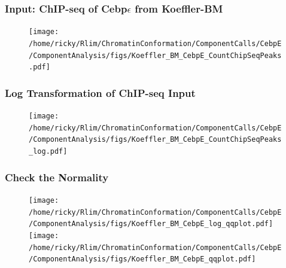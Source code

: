 \documentclass[notes]{beamer}
\begin{document}
\begin{frame}
    \frametitle{Input: ChIP-seq of Cebp$\epsilon$ from Koeffler-BM}
    \begin{figure}
        \texttt{[image: /home/ricky/Rlim/ChromatinConformation/ComponentCalls/CebpE/ComponentAnalysis/figs/Koeffler\_BM\_CebpE\_CountChipSeqPeaks.pdf]}
    \end{figure}
\end{frame}

\begin{frame}                                                                                                                        
    \frametitle{Log Transformation of ChIP-seq Input}
    \begin{figure}
        \texttt{[image: /home/ricky/Rlim/ChromatinConformation/ComponentCalls/CebpE/ComponentAnalysis/figs/Koeffler\_BM\_CebpE\_CountChipSeqPeaks\_log.pdf]}
    \end{figure}
\end{frame}

\begin{frame}                                                                                                                        
    \frametitle{Check the Normality}
    \begin{figure}
        \texttt{[image: /home/ricky/Rlim/ChromatinConformation/ComponentCalls/CebpE/ComponentAnalysis/figs/Koeffler\_BM\_CebpE\_log\_qqplot.pdf]}
        \texttt{[image: /home/ricky/Rlim/ChromatinConformation/ComponentCalls/CebpE/ComponentAnalysis/figs/Koeffler\_BM\_CebpE\_qqplot.pdf]}
    \end{figure}
\end{frame}
\end{document}
